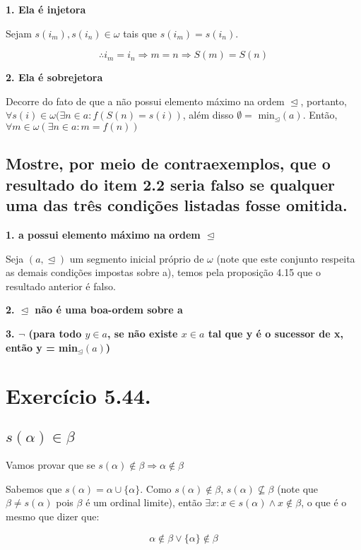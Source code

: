\documentclass[12pt]{extarticle}
\begin{document}
\textbf{1. Ela é injetora}

Sejam $s(i_m), s(i_n) \in \omega $ tais que $s(i_m) = s(i_n)$.

$$
\therefore i_m = i_n \Rightarrow m = n \Rightarrow S(m) = S(n)
$$



\textbf{2. Ela é sobrejetora}

Decorre do fato de que a não possui elemento máximo na ordem $\trianglelefteq$, portanto, $\forall s(i) \in \omega (\exists n \in a: f(S(n) = s(i))$, além disso $\emptyset =$ min$_{\trianglelefteq}(a)$. Então, $\forall m \in \omega (\exists n \in a : m = f(n))$

\subsection{Mostre, por meio de contraexemplos, que o resultado do item 2.2 seria falso se qualquer uma das três condições listadas fosse omitida.}

\textbf{1. a possui elemento máximo na ordem $\trianglelefteq$}

Seja $(a, \trianglelefteq)$ um segmento inicial próprio de $\omega$ (note que este conjunto respeita as demais condições impostas sobre a), temos pela proposição 4.15 que o resultado anterior é falso. 

\textbf{2. $\trianglelefteq$ não é uma boa-ordem sobre a}



\textbf{3. $\neg$ (para todo $y \in a$, se não existe $x \in a$ tal que y é o sucessor de x, então y = min$_{\trianglelefteq}(a)$)}


\section{Exercício 5.44.}

\subsection{$s(\alpha) \in \beta$}

Vamos provar que se $s(\alpha) \notin \beta \Rightarrow \alpha \notin \beta$

Sabemos que $s(\alpha) = \alpha \cup \{\alpha\}$. Como $s(\alpha) \notin \beta$, $s(\alpha) \nsubseteq \beta$ (note que $\beta \neq s(\alpha)$ pois $\beta$ é um ordinal limite), então $\exists x : x \in s(\alpha) \land x \notin \beta$, o que é o mesmo que dizer que:

$$
\alpha \notin \beta \lor \{\alpha\} \notin \beta
$$
\end{document}
